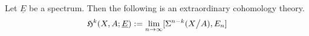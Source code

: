 \documentclass[a4paper,11pt]{article}
\begin{document}








    

\begin{theodef}\label{spectrum cohomology}
    Let \(\underline{E}\) be a spectrum. Then the following is an extraordinary cohomology theory.
    \[\mathfrak{H}^k(X,A;\underline{E}):=\lim_{n\to\infty}[\Sigma^{n-k}(X\big/A),E_n]\]
\end{theodef}
\end{document}

